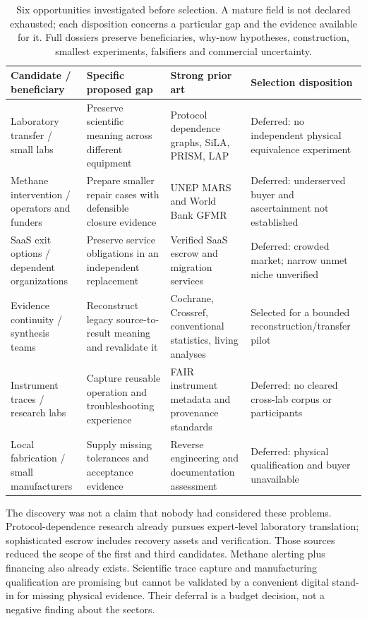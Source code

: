 \documentclass[11pt]{article}
\begin{document}
\begin{table}[htbp]
\small
\begin{tabularx}{\textwidth}{p{}YYY}
\toprule
Candidate / beneficiary & Specific proposed gap & Strong prior art & Selection disposition\\
\midrule
Laboratory transfer / small labs & Preserve scientific meaning across different equipment & Protocol dependence graphs, SiLA, PRISM, LAP & Deferred: no independent physical equivalence experiment\\
Methane intervention / operators and funders & Prepare smaller repair cases with defensible closure evidence & UNEP MARS and World Bank GFMR & Deferred: underserved buyer and ascertainment not established\\
SaaS exit options / dependent organizations & Preserve service obligations in an independent replacement & Verified SaaS escrow and migration services & Deferred: crowded market; narrow unmet niche unverified\\
Evidence continuity / synthesis teams & Reconstruct legacy source-to-result meaning and revalidate it & Cochrane, Crossref, conventional statistics, living analyses & Selected for a bounded reconstruction/transfer pilot\\
Instrument traces / research labs & Capture reusable operation and troubleshooting experience & FAIR instrument metadata and provenance standards & Deferred: no cleared cross-lab corpus or participants\\
Local fabrication / small manufacturers & Supply missing tolerances and acceptance evidence & Reverse engineering and documentation assessment & Deferred: physical qualification and buyer unavailable\\
\bottomrule
\end{tabularx}
\caption{Six opportunities investigated before selection. A mature field is not declared exhausted; each disposition concerns a particular gap and the evidence available for it. Full dossiers preserve beneficiaries, why-now hypotheses, construction, smallest experiments, falsifiers and commercial uncertainty.}
\end{table}

The discovery was not a claim that nobody had considered these problems. Protocol-dependence research already pursues expert-level laboratory translation; sophisticated escrow includes recovery assets and verification. Those sources reduced the scope of the first and third candidates.\citep{protocol,escode} Methane alerting plus financing also already exists.\citep{mars,gfmr} Scientific trace capture and manufacturing qualification are promising but cannot be validated by a convenient digital stand-in for missing physical evidence. Their deferral is a budget decision, not a negative finding about the sectors.
\end{document}
